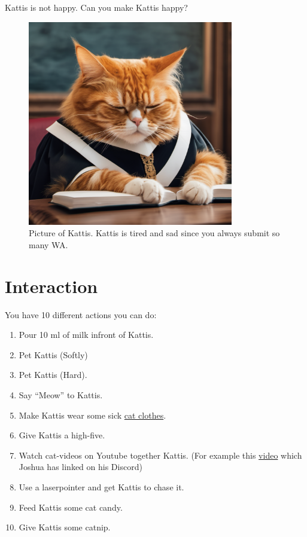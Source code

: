 
Kattis is not happy. Can you make Kattis happy?

\begin{centering}
  \begin{figure}[h]
      \centering
      \includegraphics[width=0.8\textwidth]{tired-kattis.png}
      \caption{Picture of Kattis. Kattis is tired and sad since you always submit so many WA. }
  \end{figure}
\end{centering}


\section*{Interaction}
You have 10 different actions you can do:

\begin{enumerate}
  \item Pour 10 ml of milk infront of Kattis.
  \item Pet Kattis (Softly)
  \item Pet Kattis (Hard).
  \item Say ``Meow'' to Kattis.
  \item Make Kattis wear some sick \href{https://www.amazon.se/kostymer-roliga-husdjur-kattunge-outfits/dp/B08XX7W5F9}{cat clothes}.
  \item Give Kattis a high-five.
  \item Watch cat-videos on Youtube together Kattis. (For example this \href{https://www.youtube.com/watch?v=NAh9oLs67Cw}{video} which Joshua has linked on his Discord)
  \item Use a laserpointer and get Kattis to chase it.
  \item Feed Kattis some cat candy.
  \item Give Kattis some catnip.
\end{enumerate}

